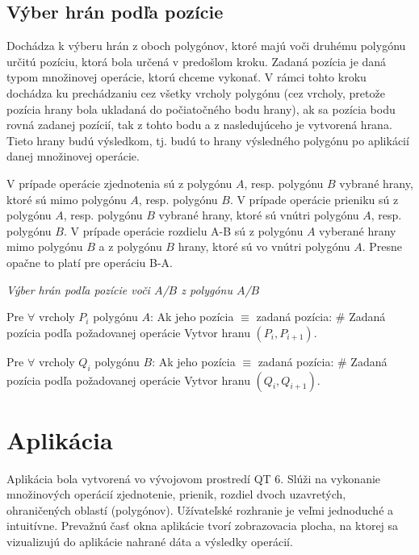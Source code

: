 \documentclass[11pt]{article}
\begin{document}
\subsection{Výber hrán podľa pozície}
Dochádza k výberu hrán z oboch polygónov, ktoré majú voči druhému polygónu určitú pozíciu, ktorá bola určená v predošlom kroku. Zadaná pozícia je daná typom množinovej operácie, ktorú chceme vykonať. V rámci tohto kroku dochádza ku prechádzaniu cez všetky vrcholy polygónu (cez vrcholy, pretože pozícia hrany bola ukladaná do počiatočného bodu hrany), ak sa pozícia bodu rovná zadanej pozícií, tak z tohto bodu a z nasledujúceho je vytvorená hrana. Tieto hrany budú výsledkom, tj. budú to hrany výsledného polygónu po aplikácií danej množinovej operácie.

V prípade operácie zjednotenia sú z polygónu $A$, resp. polygónu $B$ vybrané hrany, ktoré sú mimo polygónu $A$, resp. polygónu $B$. V prípade operácie prieniku sú z polygónu $A$, resp. polygónu $B$ vybrané hrany, ktoré sú vnútri polygónu $A$, resp. polygónu $B$. V prípade operácie rozdielu A-B sú z polygónu $A$ vyberané hrany mimo polygónu $B$ a z polygónu $B$ hrany, ktoré sú vo vnútri polygónu $A$. Presne opačne to platí pre operáciu B-A.

\begin{algorithm}
    \caption {\textit{Výber hrán podľa pozície voči $A$/$B$ z polygónu $A$/$B$}}
    \begin{algorithmic}[1]
        \State Pre $\forall$ vrcholy $P_i$ polygónu $A$:
        \State \indent Ak jeho pozícia $\equiv$ zadaná pozícia: \quad \quad \# Zadaná pozícia podľa požadovanej operácie
        \State \indent \indent Vytvor hranu $(P_i, P_{i+1})$.
        
        \State Pre $\forall$ vrcholy $Q_i$ polygónu $B$:
        \State \indent Ak jeho pozícia $\equiv$ zadaná pozícia: \quad \quad \# Zadaná pozícia podľa požadovanej operácie
        \State \indent \indent Vytvor hranu $(Q_i, Q_{i+1})$.
    \end{algorithmic}
\end{algorithm}

\newpage
\section{Aplikácia}
Aplikácia bola vytvorená vo vývojovom prostredí QT 6. Slúži na vykonanie množinových operácií zjednotenie, prienik, rozdiel dvoch uzavretých, ohraničených oblastí (polygónov). Užívateľské rozhranie je veľmi jednoduché a intuitívne. Prevažnú časť okna aplikácie tvorí zobrazovacia plocha, na ktorej sa vizualizujú do aplikácie nahrané dáta a výsledky operácií.
\end{document}
